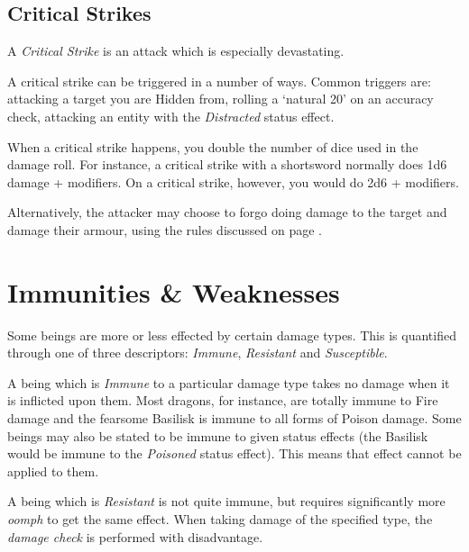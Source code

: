 


\subsection{Critical Strikes}\label{S:Sneak}

A {\it Critical Strike} is an attack which is especially devastating. 

A critical strike can be triggered in a number of ways. Common triggers are: attacking a target you are Hidden from, rolling a `natural 20' on an accuracy check, attacking an entity with the {\it Distracted} status effect. 

When a critical strike happens, you double the number of dice used in the damage roll. For instance, a critical strike with a shortsword normally does 1d6 damage + modifiers. On a critical strike, however, you would do 2d6 + modifiers. 

Alternatively, the attacker may choose to forgo doing damage to the target and damage their armour, using the rules discussed on page \pageref{S:DestroyArmour}.

\section{Immunities \& Weaknesses}

Some beings are more or less effected by certain damage types. This is quantified through one of three descriptors: {\it Immune}, {\it Resistant} and {\it Susceptible}. 

A being which is {\it Immune} to a particular damage type takes no damage when it is inflicted upon them. Most dragons, for instance, are totally immune to Fire damage and the fearsome Basilisk is immune to all forms of Poison damage. Some beings may also be stated to be immune to given status effects (the Basilisk would be immune to the {\it Poisoned} status effect). This means that effect cannot be applied to them. 

A being which is {\it Resistant} is not quite immune, but requires significantly more {\it oomph} to get the same effect. When taking damage of the specified type, the {\it damage check} is performed with disadvantage. 

